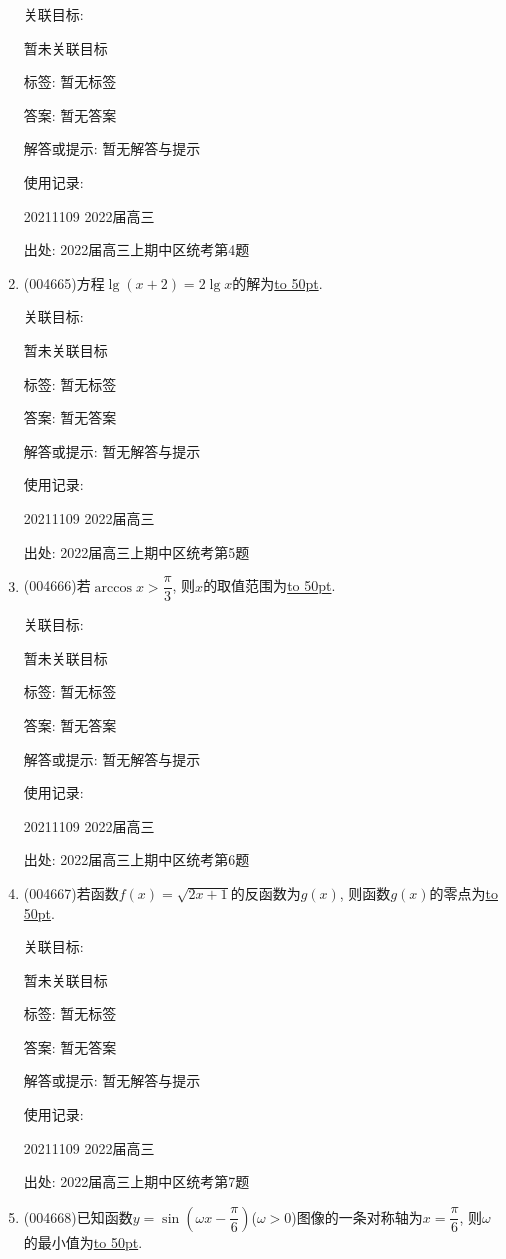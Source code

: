 \documentclass[10pt,a4paper]{article}
\newcommand{\blank}[1]{\underline{\hbox to #1pt{}}}
\begin{document}
\begin{enumerate}[1.]
关联目标:

暂未关联目标



标签: 暂无标签

答案: 暂无答案

解答或提示: 暂无解答与提示

使用记录:

20211109	2022届高三	


出处: 2022届高三上期中区统考第4题
\item { (004665)}方程$\lg (x+2)=2\lg x$的解为\blank{50}.


关联目标:

暂未关联目标



标签: 暂无标签

答案: 暂无答案

解答或提示: 暂无解答与提示

使用记录:

20211109	2022届高三	


出处: 2022届高三上期中区统考第5题
\item { (004666)}若$\arccos x>\dfrac{\pi}3$, 则$x$的取值范围为\blank{50}.


关联目标:

暂未关联目标



标签: 暂无标签

答案: 暂无答案

解答或提示: 暂无解答与提示

使用记录:

20211109	2022届高三	


出处: 2022届高三上期中区统考第6题
\item { (004667)}若函数$f(x)=\sqrt{2x+1}$的反函数为$g(x)$, 则函数$g(x)$的零点为\blank{50}.


关联目标:

暂未关联目标



标签: 暂无标签

答案: 暂无答案

解答或提示: 暂无解答与提示

使用记录:

20211109	2022届高三	


出处: 2022届高三上期中区统考第7题
\item { (004668)}已知函数$y=\sin (\omega x-\dfrac{\pi}6)$($\omega >0$)图像的一条对称轴为$x=\dfrac{\pi}6$, 则$\omega$的最小值为\blank{50}.



\end{enumerate}
\end{document}
